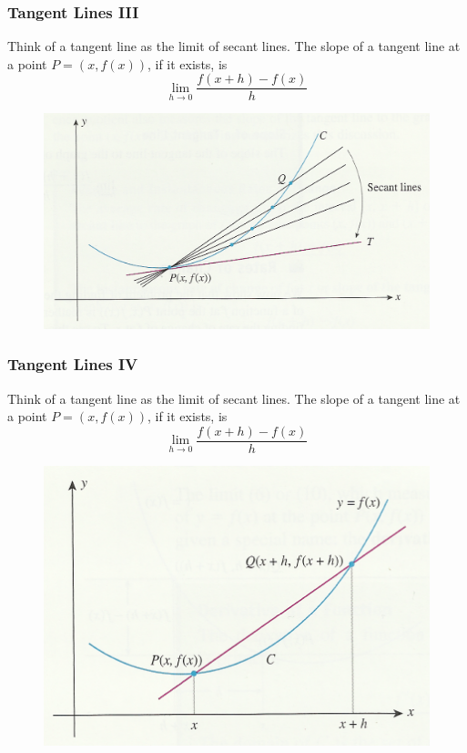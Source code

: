 \documentclass[xcolor=dvipsnames]{beamer}
\begin{document}
\begin{frame}
  \frametitle{Tangent Lines III}
  Think of a tangent line as the limit of secant lines. The slope of a
  tangent line at a point $P=(x,f(x))$, if it exists, is
\begin{equation}
  \label{eq:cheevooj}
  \lim_{h\rightarrow{}0}\frac{f(x+h)-f(x)}{h}
\end{equation}
  \begin{figure}[h]
    \includegraphics[scale=.7]{./tangent1.png}
  \end{figure}
\end{frame}

\begin{frame}
  \frametitle{Tangent Lines IV}
  Think of a tangent line as the limit of secant lines. The slope of a
  tangent line at a point $P=(x,f(x))$, if it exists, is
\begin{equation}
  \label{eq:faiseeth}
  \lim_{h\rightarrow{}0}\frac{f(x+h)-f(x)}{h}
\end{equation}
  \begin{figure}[h]
    \includegraphics[scale=.7]{./tangent2.png}
  \end{figure}
\end{frame}
\end{document}
